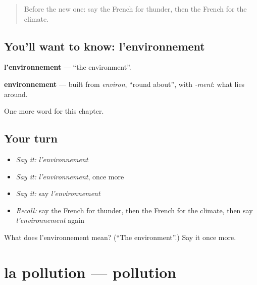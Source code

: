 \label{lesson:FR-C229-environnement}



\begin{quote}
Before the new one: say the French for thunder, then the French for the climate.
\end{quote}

\subsection*{You'll want to know: l'environnement}
\textbf{l'environnement} — \textquotedblleft{}the environment\textquotedblright{}.

\begin{cousinweb}
\textbf{environnement} — built from \emph{environ}, \textquotedblleft{}round about\textquotedblright{}, with \emph{-ment}: what lies around.
\end{cousinweb}

\begin{grammarlens}[title={What you've built}]
One more word for this chapter.
\end{grammarlens}

\subsection*{Your turn}
\begin{itemize}
\raggedright
  \item \emph{Say it:} \emph{l'environnement}
  \item \emph{Say it:} \emph{l'environnement}, once more
  \item \emph{Say it:} say \emph{l'environnement}
  \item \emph{Recall:} say the French for thunder, then the French for the climate, then say \emph{l'environnement} again
\end{itemize}

\begin{tcolorbox}[breakable,colback=teal!4,colframe=teal!35!black,title={Before you move on}]
What does l'environnement mean? (\textquotedblleft{}The environment\textquotedblright{}.) Say it once more.
\end{tcolorbox}
\section[la pollution]{la pollution — pollution}

\label{lesson:FR-C229-pollution}



